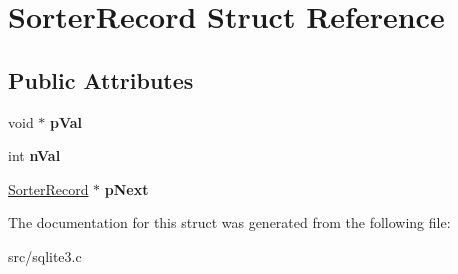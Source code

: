 \hypertarget{struct_sorter_record}{\section{Sorter\-Record Struct Reference}
\label{struct_sorter_record}
}
\subsection*{Public Attributes}
\begin{DoxyCompactItemize}
\item 
\hypertarget{struct_sorter_record_af59daa686859ca44f7f0be92b3f0d133}{void $\ast$ {\bfseries p\-Val}}\label{struct_sorter_record_af59daa686859ca44f7f0be92b3f0d133}

\item 
\hypertarget{struct_sorter_record_a2b8ffc0f8410826de8b41425759bf462}{int {\bfseries n\-Val}}\label{struct_sorter_record_a2b8ffc0f8410826de8b41425759bf462}

\item 
\hypertarget{struct_sorter_record_a08fdaa8302834166f6a8d12e09c95b58}{\hyperlink{struct_sorter_record}{Sorter\-Record} $\ast$ {\bfseries p\-Next}}\label{struct_sorter_record_a08fdaa8302834166f6a8d12e09c95b58}

\end{DoxyCompactItemize}


The documentation for this struct was generated from the following file\-:\begin{DoxyCompactItemize}
\item 
src/sqlite3.\-c\end{DoxyCompactItemize}
